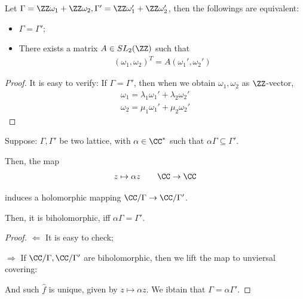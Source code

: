 \documentclass[Total.tex]{subfiles}
\begin{document}
			\begin{proposition}
				Let $\Gamma=\ZZ\omega_1+\ZZ \omega_2,\Gamma'=\ZZ \omega_1'+\ZZ \omega_2'$, then the followings are equivalent:
				\begin{itemize}
					\item $\Gamma=\Gamma'$;
					\item There exists a matrix $A\in SL_2(\ZZ)$ such that
					\begin{gather*}
						(\omega_1,\omega_2)^T=A(\omega_1',\omega_2')
					\end{gather*}
				\end{itemize}
			\end{proposition}
			\begin{proof}
				It is easy to verify: If $\Gamma=\Gamma'$, then when we obtain $\omega_1,\omega_2$ as $\ZZ$-vector,
				\begin{gather*}
					\omega_1=\lambda_1 \omega_1'+\lambda_2\omega_2'\\
					\omega_2=\mu_1 \omega_1'+\mu_2 \omega_2'
				\end{gather*}
			\end{proof}
			
			\begin{proposition}
				Suppose: $\Gamma,\Gamma'$ be two lattice, with $\alpha\in \CC^*$ such that $\alpha \Gamma\subseteq \Gamma'$. 
				
				Then, the map 
				\begin{gather*}
					z\mapsto \alpha z\qquad \CC\rightarrow \CC
				\end{gather*}
				
				induces a holomorphic mapping $\CC/\Gamma\rightarrow \CC/\Gamma'$. 
				
				Then, it is biholomorphic, iff $\alpha\Gamma=\Gamma'$. 
			\end{proposition}
			\begin{proof}
				$\Leftarrow$ It is easy to check;
				
				$\Rightarrow$ If $\CC/\Gamma,\CC/\Gamma'$ are biholomorphic, then we lift the map to unviersal covering:
				\begin{center}
				\end{center}
				
				And such $\hat{f}$ is unique, given by $z\mapsto \alpha z$. We ibtain that $\Gamma=\alpha \Gamma'$. 
			\end{proof}
			
\end{document}
